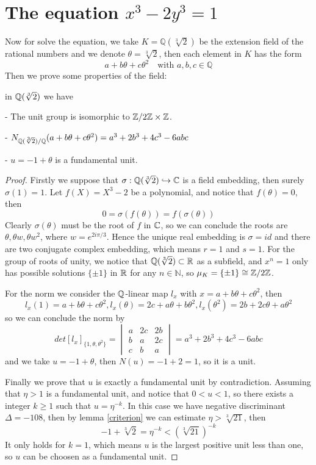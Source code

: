 \section{The equation $x^3-2y^3=1$}
Now for solve the equation, we take \(K = \mathbb{Q}(\sqrt[3]{2})\) be the extension field of the rational numbers and we denote \(\theta = \sqrt[3]{2}\), then each element in \(K\) has the form
\[a+b\theta +c \theta^2 \quad  \text{with } a,b,c  \in \mathbb{Q}\]
Then we prove some properties of the field:
\begin{proposition} \label{qqsqrt}
    in \(\mathbb{Q}(\sqrt[3]{2})\) we have

    - The unit group is isomorphic to \(\mathbb{Z}/2\mathbb{Z} \times \mathbb{Z}\).

    - \(N_{\mathbb{Q}(\sqrt[3]{2}) / \mathbb{Q}}(a+b\theta+c\theta^2) = a^3+2b^3+4c^3-6abc\)

    - \(u = -1 + \theta \) is a fundamental unit.


    \begin{proof}
        Firstly we suppose that \(\sigma: \mathbb{Q}(\sqrt[3]{2}) \hookrightarrow  \mathbb{C} \) is a field embedding, then surely \(\sigma(1)=1\). Let \(f(X) = X^3-2\) be a polynomial, and notice that \(f(\theta) = 0\), then
        \[0 = \sigma(f(\theta)) = f(\sigma(\theta))\]
        Clearly \(\sigma(\theta)\) must be the root of \(f\) in \(\mathbb{C}\), so we can conclude the roots are \(\theta, \theta w , \theta w^2\), where \(w = e^{2i\pi /3}\). Hence the unique real embedding is \(\sigma=id\) and there are two conjugate complex embedding, which means \(r=1\) and \(s=1\). For the group of roots of unity, we notice that \(\mathbb{Q}(\sqrt[3]{2}) \subset \mathbb{R}\) as a subfield, and \(x^n=1\) only has possible solutions \(\{\pm 1\}\) in \(\mathbb{R}\) for any \(n \in \mathbb{N}\), so \(\mu_K = \{\pm 1\} \cong \mathbb{Z}/2\mathbb{Z}\).

        For the norm we consider the \(\mathbb{Q}\)-linear map \(l_x\) with \(x=a+b \theta + c \theta^2\), then
        \[l_x(1) = a+b \theta + c \theta^2, l_x(\theta )= 2c+a \theta + b \theta ^2, l_x(\theta ^2) = 2b+ 2c \theta + a \theta ^2 \]
        so we can conclude the norm by 
        \[det{[l_x]_{\{1,\theta,\theta ^2\}}} = \begin{vmatrix}
            a & 2c & 2b \\
            b & a & 2c \\
            c & b & a
        \end{vmatrix} = a^3+2b^3+4c^3-6abc\]
        and we take \(u= -1 + \theta\), then \(N(u) = -1+2=1\), so it is a unit.

        Finally we prove that \(u\) is exactly a fundamental unit by contradiction. Assuming that \(\eta>1\) is a fundamental unit, and notice that \(0<u<1\), so there exists a integer \(k \geq 1\) such that \(u = \eta^{-k}\). In this case we have negative discriminant \(\Delta = -108\), then by lemma \ref{criterion} we can estimate \(\eta > \sqrt[3]{21}\), then 
        \[-1 + \sqrt[3]{2} = \eta^{-k} < (\sqrt[3]{21})^{-k}\]
        It only holds for \(k=1\), which means \(u\) is the largest positive unit less than one, so \(u\) can be choosen as a fundamental unit.
        
    \end{proof}
\end{proposition}

